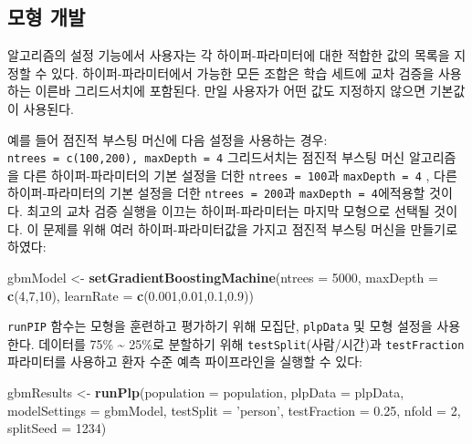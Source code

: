 \documentclass[11pt]{book}
\newenvironment{Shaded}{\begin{snugshade}}{\end{snugshade}}
\newcommand{\KeywordTok}[1]{\textcolor[rgb]{0.13,0.29,0.53}{\textbf{#1}}}
\newcommand{\DataTypeTok}[1]{\textcolor[rgb]{0.13,0.29,0.53}{#1}}
\newcommand{\DecValTok}[1]{\textcolor[rgb]{0.00,0.00,0.81}{#1}}
\newcommand{\FloatTok}[1]{\textcolor[rgb]{0.00,0.00,0.81}{#1}}
\newcommand{\StringTok}[1]{\textcolor[rgb]{0.31,0.60,0.02}{#1}}
\newcommand{\NormalTok}[1]{#1}
\theoremstyle{definition}
\theoremstyle{definition}
\theoremstyle{definition}
\theoremstyle{remark}
\begin{document}
\subsection{모형 개발}\label{-}

알고리즘의 설정 기능에서 사용자는 각 하이퍼-파라미터에 대한 적합한 값의
목록을 지정할 수 있다. 하이퍼-파라미터에서 가능한 모든 조합은 학습
세트에 교차 검증을 사용하는 이른바 그리드서치에 포함된다. 만일 사용자가
어떤 값도 지정하지 않으면 기본값이 사용된다.

예를 들어 점진적 부스팅 머신에 다음 설정을 사용하는 경우:
\texttt{ntrees\ =\ c(100,200),\ maxDepth\ =\ 4} 그리드서치는 점진적
부스팅 머신 알고리즘을 다른 하이퍼-파라미터의 기본 설정을 더한
\texttt{ntrees\ =\ 100}과 \texttt{maxDepth\ =\ 4} , 다른
하이퍼-파라미터의 기본 설정을 더한 \texttt{ntrees\ =\ 200}과
\texttt{maxDepth\ =\ 4}에적용할 것이다. 최고의 교차 검증 실행을 이끄는
하이퍼-파라미터는 마지막 모형으로 선택될 것이다. 이 문제를 위해 여러
하이퍼-파라미터값을 가지고 점진적 부스팅 머신을 만들기로 하였다:

\begin{Shaded}
\begin{Highlighting}[]
\NormalTok{gbmModel <-}\StringTok{ }\KeywordTok{setGradientBoostingMachine}\NormalTok{(}\DataTypeTok{ntrees =} \DecValTok{5000}\NormalTok{, }
                                       \DataTypeTok{maxDepth =} \KeywordTok{c}\NormalTok{(}\DecValTok{4}\NormalTok{,}\DecValTok{7}\NormalTok{,}\DecValTok{10}\NormalTok{), }
                                       \DataTypeTok{learnRate =} \KeywordTok{c}\NormalTok{(}\FloatTok{0.001}\NormalTok{,}\FloatTok{0.01}\NormalTok{,}\FloatTok{0.1}\NormalTok{,}\FloatTok{0.9}\NormalTok{))}
\end{Highlighting}
\end{Shaded}

\texttt{runPIP} 함수는 모형을 훈련하고 평가하기 위해 모집단,
\texttt{plpData} 및 모형 설정을 사용한다. 데이터를 75\%
\textasciitilde{} 25\%로 분할하기 위해 \texttt{testSplit}(사람/시간)과
\texttt{testFraction} 파라미터를 사용하고 환자 수준 예측 파이프라인을
실행할 수 있다:

\begin{Shaded}
\begin{Highlighting}[]
\NormalTok{gbmResults <-}\StringTok{ }\KeywordTok{runPlp}\NormalTok{(}\DataTypeTok{population =}\NormalTok{ population, }
                     \DataTypeTok{plpData =}\NormalTok{ plpData, }
                     \DataTypeTok{modelSettings =}\NormalTok{ gbmModel, }
                     \DataTypeTok{testSplit =} \StringTok{'person'}\NormalTok{,}
                     \DataTypeTok{testFraction =} \FloatTok{0.25}\NormalTok{, }
                     \DataTypeTok{nfold =} \DecValTok{2}\NormalTok{, }
                     \DataTypeTok{splitSeed =} \DecValTok{1234}\NormalTok{)}
\end{Highlighting}
\end{Shaded}
\end{document}
